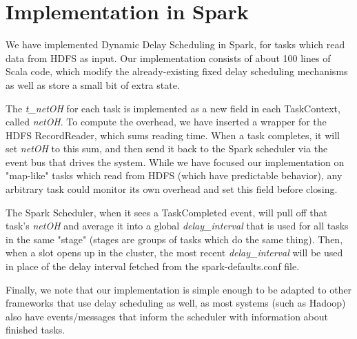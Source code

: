 \section{Implementation in Spark}\label{sec:impl}

We have implemented Dynamic Delay Scheduling in Spark, for tasks which read data
from HDFS as input.
Our implementation consists of about 100 lines of Scala code, which modify the
already-existing fixed delay scheduling mechanisms as well as store a small bit
of extra state.

The \textit{t\_netOH} for each task is implemented as a new field in 
each TaskContext, called \textit{netOH}. To compute the overhead, we have inserted a 
wrapper for the HDFS RecordReader, which sums reading time. When a task completes, it 
will set \textit{netOH} to this sum, and then send it back to the Spark scheduler via the 
event bus that drives the system. While we have focused our implementation on "map-like" 
tasks which read from HDFS (which have predictable behavior), any arbitrary task could 
monitor its own overhead and set this field before closing.

The Spark Scheduler, when it sees a TaskCompleted event, will pull off that task's 
\textit{netOH} and average it into a global \textit{delay\_interval} that is used for all 
tasks in the same "stage" (stages are groups of tasks which do the same thing). Then, 
when a slot opens up in the cluster, the most recent \textit{delay\_interval} will be 
used in place of the delay interval fetched from the spark-defaults.conf file. 

Finally, we note that our implementation is simple enough to be adapted to other frameworks
that use delay scheduling as well, as most systems (such as Hadoop) also have events/messages
that inform the scheduler with information about finished tasks.

